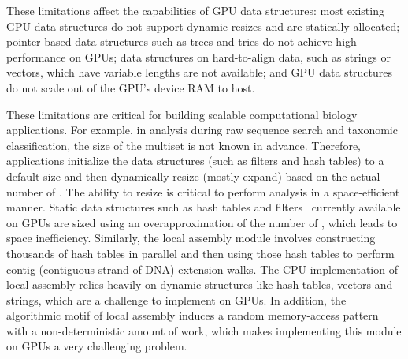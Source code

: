 These limitations affect the capabilities of GPU data structures: most existing GPU data structures do not support dynamic resizes and are statically allocated; pointer-based data structures such as trees and tries do not achieve high performance on GPUs; data structures on hard-to-align data, such as strings or vectors, which have variable lengths are not available; and GPU data structures do not scale out of the GPU's device RAM to host.

These limitations are critical for building scalable computational biology applications. For example, in \kmer analysis during raw sequence search and taxonomic classification, the size of the \kmer multiset is not known in advance. Therefore, applications initialize the data structures (such as filters and hash tables) to a default size and then dynamically resize (mostly expand) based on the actual number of \kmers. The ability to resize is critical to perform \kmer analysis in a space-efficient manner. Static data structures such as hash tables and filters~\cite{Geil:2018:QFA} currently available on GPUs are sized using an overapproximation of the number of \kmers, which leads to space inefficiency.
Similarly, the local assembly module involves constructing thousands of hash tables in parallel and then using those hash tables to perform contig (contiguous strand of DNA) extension walks. The CPU implementation of local assembly relies heavily on dynamic
structures like hash tables, vectors and strings, which are a challenge to implement on GPUs. In addition, the algorithmic motif of local assembly induces a random memory-access pattern with a non-deterministic amount of work, which makes implementing this module on GPUs a very challenging problem.




